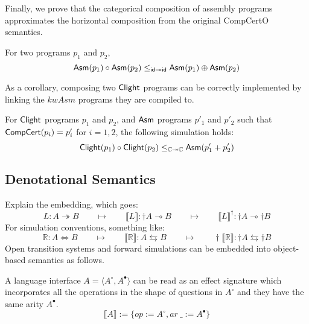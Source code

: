 \documentclass[acmsmall,review,anonymous]{acmart}\settopmatter{printfolios=true,printccs=false,printacmref=false}
\begin{document}
Finally, we prove that the categorical composition of assembly programs
approximates the horizontal composition from the original CompCertO
semantics.
\begin{theorem}
  For two  programs $p_1$ and $p_2$,
  \[
     \mathsf{Asm} (p_1) \circ  \mathsf{Asm} (p_2) \le_{ \mathsf{id}  \twoheadrightarrow  \mathsf{id} }
     \mathsf{Asm} (p_1) \oplus  \mathsf{Asm} (p_2)
  \]
\end{theorem}
As a corollary, composing two $ \mathsf{Clight} $ programs can be correctly
implemented by linking the $kw{Asm}$ programs they are compiled to.
\begin{corollary}
  For $ \mathsf{Clight} $ programs $p_1$ and $p_2$, and $ \mathsf{Asm} $ programs
  $p'_1$ and $p'_2$ such that $ \mathsf{CompCert} (p_i) = p'_i$ for $i=1,2$,
  the following simulation holds:
  \[
     \mathsf{Clight} (p_1)\circ \mathsf{Clight} (p_2) \le_{\mathbb{C} \twoheadrightarrow \mathbb{C}}
     \mathsf{Asm} (p'_1 + p'_2)
  \]
\end{corollary}

\subsection{Denotational Semantics}

Explain the embedding, which goes:
\[
  L : A \twoheadrightarrow B
  \qquad \mapsto \qquad
  \llbracket L \rrbracket : {\dagger} A \multimap B
  \qquad \mapsto \qquad
  \llbracket L \rrbracket^\dagger : {\dagger} A \multimap {\dagger} B
\]
For simulation conventions, something like:
\[
  \mathbb{R} : A \Leftrightarrow B
  \qquad \mapsto \qquad
  \llbracket \mathbb{R} \rrbracket : A \leftrightarrows B
  \qquad \mapsto \qquad
  {\dagger}\llbracket \mathbb{R} \rrbracket :
    {\dagger}A \leftrightarrows {\dagger}B
\]
Open transition systems and forward simulations can be embedded into
object-based semantics as follows.

A language interface
$A = \langle A^\circ, A^\bullet \rangle$ can be read as an effect signature
which incorporates all the operations in the shape of questions in $A^\circ$ and
they have the same arity $A^\bullet$.
\[
  \llbracket A \rrbracket \mathrel{:=}
  \{ op \mathrel{:=} A^\circ, ar\ \_ \mathrel{:=} A^\bullet \}
\]
\end{document}
